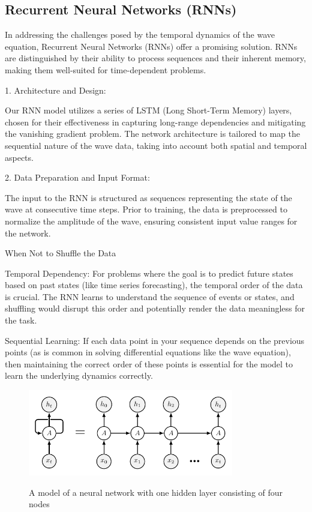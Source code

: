 \documentclass[twoside,11pt]{report}
\begin{document}
\subsection{Recurrent Neural Networks (RNNs)}
\label{sec:rnn}

    In addressing the challenges posed by the temporal dynamics of the wave equation, Recurrent 
    Neural Networks (RNNs) offer a promising solution. RNNs are distinguished by their ability to 
    process sequences and their inherent memory, making them well-suited for time-dependent problems.

    1. Architecture and Design:

        Our RNN model utilizes a series of LSTM (Long Short-Term Memory) layers, chosen for their 
        effectiveness in capturing long-range dependencies and mitigating the vanishing gradient problem.
        The network architecture is tailored to map the sequential nature of the wave data, taking 
        into account both spatial and temporal aspects.

    2. Data Preparation and Input Format:

        The input to the RNN is structured as sequences representing the state of the wave at consecutive 
        time steps.
        Prior to training, the data is preprocessed to normalize the amplitude of the wave, ensuring 
        consistent input value ranges for the network.

    When Not to Shuffle the Data

        Temporal Dependency: For problems where the goal is to predict future 
        states based on past states (like time series forecasting), the temporal 
        order of the data is crucial. The RNN learns to understand the sequence of 
        events or states, and shuffling would disrupt this order and potentially render 
        the data meaningless for the task.

        Sequential Learning: If each data point in your sequence depends on the previous 
        points (as is common in solving differential equations like the wave equation), 
        then maintaining the correct order of these points is essential for the model to 
        learn the underlying dynamics correctly.

    \begin{figure}[!h]
        \begin{center}
            \includegraphics[width=0.8\textwidth]{tikzfigures/rnn.pdf}
        \end{center}
        \caption{A model of a neural network with one hidden layer consisting of four nodes}\label{fig:rnn}
        \cite{neutelings_tikzcode}
    \end{figure}
\end{document}
